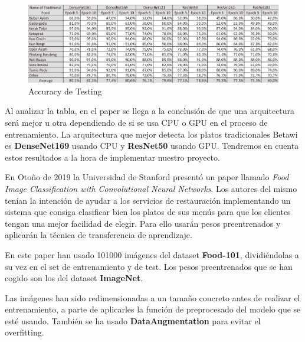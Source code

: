\vspace{5 mm}

\begin{figure}[H]
  \centering
  \includegraphics[width=1\linewidth]{Imagenes/tablapaper1.png}
  \caption{Accuracy de Testing}
  \label{fig:sub-first}
\end{figure}

\vspace{5 mm}

Al analizar la tabla, en el paper se llega a la conclusión de que una arquitectura será mejor u otra dependiendo de si se usa CPU o GPU en el proceso de entrenamiento. La arquitectura que mejor detecta los platos tradicionales Betawi es \textbf{DenseNet169} usando CPU y \textbf{ResNet50} usando GPU. Tendremos en cuenta estos resultados a la hora de implementar nuestro proyecto. 

\newpage

En Otoño de 2019 la Universidad de Stanford presentó un paper llamado \textit{Food Image Classification with Convolutional Neural Networks}. Los autores del mismo tenían la intención de ayudar a los servicios de restauración implementando un sistema que consiga clasificar bien los platos de sus menús para que los clientes tengan una mejor facilidad de elegir. Para ello usarán pesos preentrenados y aplicarán la técnica de transferencia de aprendizaje.

\vspace{3 mm}

En este paper han usado 101000 imágenes del dataset \textbf{Food-101}, dividiéndolas a su vez en el set de entrenamiento y de test. Los pesos preentrenados que se han cogido son los del dataset \textbf{ImageNet}.

\vspace{3 mm}

Las imágenes han sido redimensionadas a un tamaño concreto antes de realizar el entrenamiento, a parte de aplicarles la función de preprocesado del modelo que se esté usando. También se ha usado \textbf{DataAugmentation} para evitar el overfitting.

